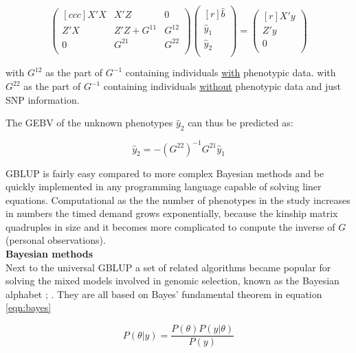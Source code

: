 \begin{equation}
 \begin{pmatrix}[ccc]
  X'X & X'Z & 0 \\ 
  Z'X & Z'Z + G^{11} & G^{12} \\ 
  0 & G^{21} & G^{22} \\ 
 \end{pmatrix}
 \begin{pmatrix}[r]
  \hat{b} \\ 
  \hat{y}_1 \\ 
  \hat{y}_2 \\ 
 \end{pmatrix}
 =
 \begin{pmatrix}[r]
  X'y \\ 
  Z'y \\ 
  0 \\ 
 \end{pmatrix}
 \label{eqn:pBLUP}
\end{equation}

with $G^{12}$ as the part of $G^{-1}$ containing individuals \underline{with} phenotypic data.
with $G^{22}$ as the part of $G^{-1}$ containing individuals \underline{without} phenotypic data and just SNP information. 

The GEBV of the unknown phenotypes $\hat{y}_2$ can thus be predicted as:

\begin{equation}
\hat{y}_2 = -\left( G^{22}\right)^{-1}G^{21}\hat{y}_1
\label{eqn:gpred}
\end{equation}

GBLUP is fairly easy compared to more complex Bayesian methods and be quickly implemented in any programming
language capable of solving liner equations. Computational as the the number of phenotypes in the study
increases in numbers the timed demand grows exponentially, because the kinship matrix quadruples in size and
it becomes more complicated to compute the inverse of $G$ (personal observations). \\

\noindent
\textbf{Bayesian methods} \\ 

Next to the universal GBLUP a set of related algorithms became popular for solving the mixed models involved in genomic selection, known as the Bayesian alphabet \cite{gianola2009}; \cite{gianola2013}. They are all based on Bayes' fundamental theorem in equation \ref{eqn:bayes}

\begin{equation}
P(\theta | y) = \frac{P(\theta )P(y | \theta)}{P(y)} 
\label{eqn:bayes}
\end{equation}

